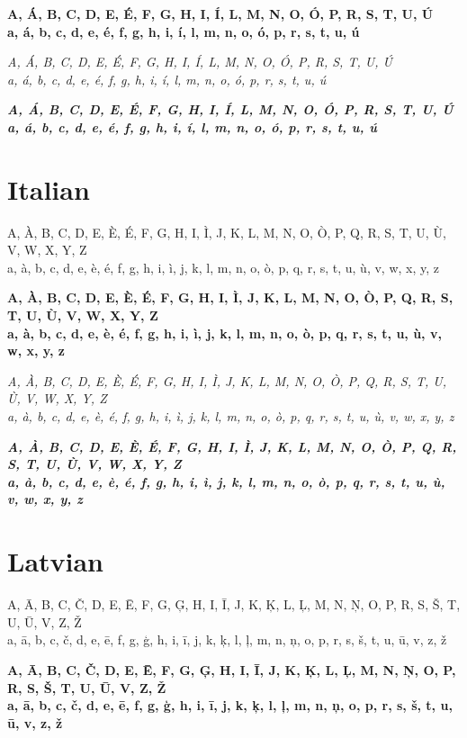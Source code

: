 \documentclass[12pt]{article}
\begin{document}
\textbf{
A, Á, B, C, D, E, É, F, G, H, I, Í, L, M, N, O, Ó, P, R, S, T, U, Ú \\
a, á, b, c, d, e, é, f, g, h, i, í, l, m, n, o, ó, p, r, s, t, u, ú
}

\textit{
A, Á, B, C, D, E, É, F, G, H, I, Í, L, M, N, O, Ó, P, R, S, T, U, Ú \\
a, á, b, c, d, e, é, f, g, h, i, í, l, m, n, o, ó, p, r, s, t, u, ú
}

\textbf{\textit{
A, Á, B, C, D, E, É, F, G, H, I, Í, L, M, N, O, Ó, P, R, S, T, U, Ú \\
a, á, b, c, d, e, é, f, g, h, i, í, l, m, n, o, ó, p, r, s, t, u, ú
}}


\section{Italian}
A, À, B, C, D, E, È, É, F, G, H, I, Ì, J, K, L, M, N, O, Ò, P, Q, R, S, T, U, Ù, V, W, X, Y, Z \\
a, à, b, c, d, e, è, é, f, g, h, i, ì, j, k, l, m, n, o, ò, p, q, r, s, t, u, ù, v, w, x, y, z

\textbf{
A, À, B, C, D, E, È, É, F, G, H, I, Ì, J, K, L, M, N, O, Ò, P, Q, R, S, T, U, Ù, V, W, X, Y, Z \\
a, à, b, c, d, e, è, é, f, g, h, i, ì, j, k, l, m, n, o, ò, p, q, r, s, t, u, ù, v, w, x, y, z
}

\textit{
A, À, B, C, D, E, È, É, F, G, H, I, Ì, J, K, L, M, N, O, Ò, P, Q, R, S, T, U, Ù, V, W, X, Y, Z \\
a, à, b, c, d, e, è, é, f, g, h, i, ì, j, k, l, m, n, o, ò, p, q, r, s, t, u, ù, v, w, x, y, z
}

\textbf{\textit{
A, À, B, C, D, E, È, É, F, G, H, I, Ì, J, K, L, M, N, O, Ò, P, Q, R, S, T, U, Ù, V, W, X, Y, Z \\
a, à, b, c, d, e, è, é, f, g, h, i, ì, j, k, l, m, n, o, ò, p, q, r, s, t, u, ù, v, w, x, y, z
}}


\clearpage
\section{Latvian}
A, Ā, B, C, Č, D, E, Ē, F, G, Ģ, H, I, Ī, J, K, Ķ, L, Ļ, M, N, Ņ, O, P, R, S, Š, T, U, Ū, V, Z, Ž \\
a, ā, b, c, č, d, e, ē, f, g, ģ, h, i, ī, j, k, ķ, l, ļ, m, n, ņ, o, p, r, s, š, t, u, ū, v, z, ž

\textbf{
A, Ā, B, C, Č, D, E, Ē, F, G, Ģ, H, I, Ī, J, K, Ķ, L, Ļ, M, N, Ņ, O, P, R, S, Š, T, U, Ū, V, Z, Ž \\
a, ā, b, c, č, d, e, ē, f, g, ģ, h, i, ī, j, k, ķ, l, ļ, m, n, ņ, o, p, r, s, š, t, u, ū, v, z, ž
}
\end{document}
